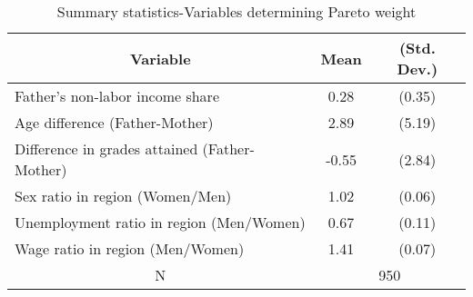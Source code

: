 
\begin{table}[H]\centering \caption{Summary statistics-Variables determining Pareto weight \label{tab:DISTRIBUTIONFACTORSDESCRIPTIVE}}
\begin{tabular}{l c c  }\hline\hline
\multicolumn{1}{c}{\textbf{Variable}} & \textbf{Mean}
 & \textbf{(Std. Dev.)} \\ \hline
Father's non-labor income share & 0.28 & (0.35)  \\
Age difference (Father-Mother) & 2.89 & (5.19)  \\
Difference in grades attained (Father-Mother) & -0.55 & (2.84)  \\
Sex ratio in region (Women/Men) & 1.02 & (0.06)  \\
Unemployment ratio in region (Men/Women) & 0.67 & (0.11)  \\
Wage ratio in region (Men/Women) & 1.41 & (0.07)  \\
\multicolumn{1}{c}{N} & \multicolumn{2}{c}{950}\\ \hline\end{tabular}
\end{table}
